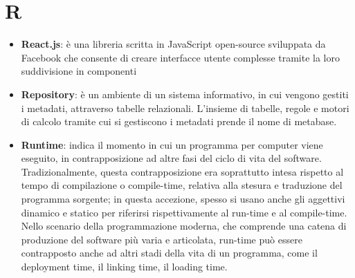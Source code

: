 \section{R}
\begin{itemize}
\item
\textbf{React.js}: è una libreria scritta in JavaScript open-source sviluppata da Facebook che consente di creare interfacce utente complesse tramite la loro suddivisione in componenti
\item
\textbf{Repository}: è un ambiente di un sistema informativo, in cui vengono gestiti i metadati, attraverso tabelle relazionali. L'insieme di tabelle, regole e motori di calcolo tramite cui si gestiscono i metadati prende il nome di metabase. 
\item
\textbf{Runtime}: indica il momento in cui un programma per computer viene eseguito, in contrapposizione ad altre fasi del ciclo di vita del software.
Tradizionalmente, questa contrapposizione era soprattutto intesa rispetto al tempo di compilazione o compile-time, relativa alla stesura e traduzione del programma sorgente; in questa accezione, spesso si usano anche gli aggettivi dinamico e statico per riferirsi rispettivamente al run-time e al compile-time. Nello scenario della programmazione moderna, che comprende una catena di produzione del software più varia e articolata, run-time può essere contrapposto anche ad altri stadi della vita di un programma, come il deployment time, il linking time, il loading time.
\end{itemize}